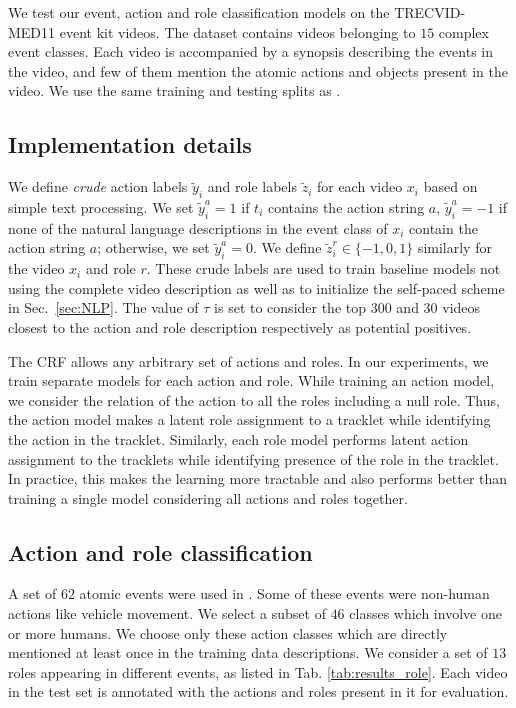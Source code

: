 \documentclass[10pt,twocolumn,letterpaper]{article}
\begin{document}
We test our event, action and role classification models on the TRECVID-MED11 event kit videos. 
The dataset contains videos belonging to $15$ complex event classes. 
Each video is accompanied by a synopsis describing the events in the video, 
and few of them mention the atomic actions and objects present in the video. 
We use the same training and testing splits as \cite{Izadinia_ECCV12}. 

\subsection{Implementation details}\label{sec:implementation_details}
We define \textit{crude} action labels $\tilde{y}_i$ and role labels
$\tilde{z}_i$ for each video $x_i$ based on simple text processing. We set
$\tilde{y}_i^a = 1$ if $t_i$ contains the action string $a$, $\tilde{y}_i^a =
-1$ if none of the natural language descriptions in the event class of $x_i$ contain
the action string $a$; otherwise, we set $\tilde{y}_i^a=0$. We define
$\tilde{z}_i^r \in \{-1,0,1\}$ similarly for the video $x_i$ and role $r$.
These crude labels are used to train baseline models not using the
complete video description as well as to initialize the self-paced scheme in
Sec.~\ref{sec:NLP}. The value of $\tau$ is set to consider the top $300$ and
$30$ videos closest to the action and role description respectively as
potential positives.

The CRF allows any arbitrary set of actions and roles. In our experiments, 
we train separate models for each action and role. 
While training an action model, we consider the relation of the action to all the roles including a null role. Thus, the action model makes a latent role assignment to a tracklet while identifying the action in the tracklet. Similarly, each role model performs latent action assignment to the tracklets while identifying presence of the role in the tracklet. In practice, this makes the learning more tractable and also performs better than training a single model considering all actions and roles together.

\subsection{Action and role classification} \label{sec:results_actionRoles}
A set of $62$ atomic events were used in \cite{Izadinia_ECCV12}. Some of these events were non-human actions like vehicle movement.
We select a subset of $46$ classes which involve one or more humans. We choose only these action classes which are directly mentioned 
at least once in the training data descriptions. We consider a set of $13$ roles appearing in different events, 
as listed in Tab. \ref{tab:results_role}. Each video in the test set is annotated with the actions and roles present in it for evaluation. 
  
\end{document}
